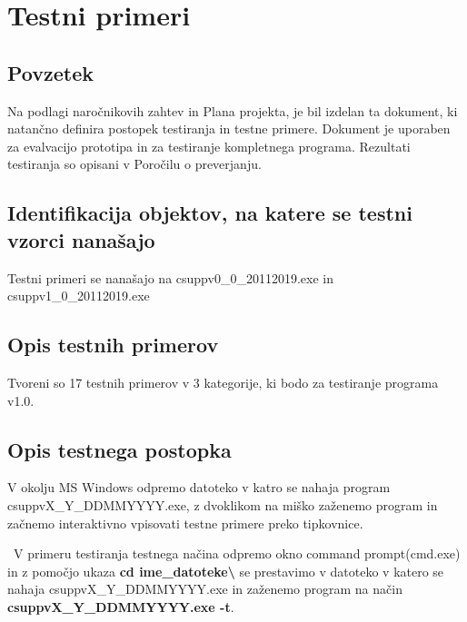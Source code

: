 \documentclass[a4paper,12pt]{article}
\begin{document}
\newpage

	\section{Testni primeri}

		\subsection{Povzetek}

		\qquad Na podlagi naročnikovih zahtev in Plana projekta, je bil izdelan ta dokument, ki natančno definira 
		postopek testiranja in testne primere. Dokument je  uporaben  za  evalvacijo  prototipa
		in  za  testiranje  kompletnega  programa.  Rezultati  testiranja  so  opisani 
		v Poročilu o preverjanju.

		\subsection{Identifikacija objektov, na katere se testni vzorci nanašajo}

		\qquad Testni primeri se nanašajo na csuppv0\_0\_20112019.exe in csuppv1\_0\_20112019.exe

		\subsection{Opis testnih primerov}

		\qquad Tvoreni so 17 testnih primerov v 3 kategorije, ki bodo za testiranje programa v1.0.

		\subsection{Opis testnega postopka}

		\qquad V okolju MS Windows odpremo datoteko v katro se nahaja program csuppvX\_Y\_DDMMYYYY.exe,
		z dvoklikom na miško zaženemo program in začnemo interaktivno vpisovati testne primere preko 
		tipkovnice. 

		\ V primeru testiranja testnega načina odpremo okno command prompt(cmd.exe) in z
		pomočjo ukaza \textbf{cd ime\_datoteke\textbackslash} se prestavimo v datoteko v katero se 
		nahaja csuppvX\_Y\_DDMMYYYY.exe in zaženemo program na način \textbf{csuppvX\_Y\_DDMMYYYY.exe -t}.

\newpage
	
\end{document}
